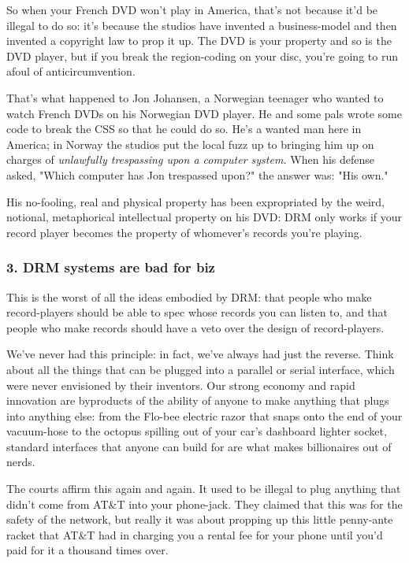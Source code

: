 So when your French DVD won't play in America, that's not because
it'd be illegal to do so: it's because the studios have invented a
business-model and then invented a copyright law to prop it up. The
DVD is your property and so is the DVD player, but if you break the
region-coding on your disc, you're going to run afoul of
anticircumvention.

That's what happened to Jon Johansen, a Norwegian teenager who
wanted to watch French DVDs on his Norwegian DVD player. He and
some pals wrote some code to break the CSS so that he could do so.
He's a wanted man here in America; in Norway the studios put the
local fuzz up to bringing him up on charges of
\emph{unlawfully trespassing upon a computer system.} When his
defense asked, "Which computer has Jon trespassed upon?" the answer
was: "His own."

His no-fooling, real and physical property has been expropriated by
the weird, notional, metaphorical intellectual property on his DVD:
DRM only works if your record player becomes the property of
whomever's records you're playing.

\subsubsection{3. DRM systems are bad for biz}

This is the worst of all the ideas embodied by DRM: that people who
make record-players should be able to spec whose records you can
listen to, and that people who make records should have a veto over
the design of record-players.

We've never had this principle: in fact, we've always had just the
reverse. Think about all the things that can be plugged into a
parallel or serial interface, which were never envisioned by their
inventors. Our strong economy and rapid innovation are byproducts
of the ability of anyone to make anything that plugs into anything
else: from the Flo-bee electric razor that snaps onto the end of
your vacuum-hose to the octopus spilling out of your car's
dashboard lighter socket, standard interfaces that anyone can build
for are what makes billionaires out of nerds.

The courts affirm this again and again. It used to be illegal to
plug anything that didn't come from AT\&T into your phone-jack.
They claimed that this was for the safety of the network, but
really it was about propping up this little penny-ante racket that
AT\&T had in charging you a rental fee for your phone until you'd
paid for it a thousand times over.


